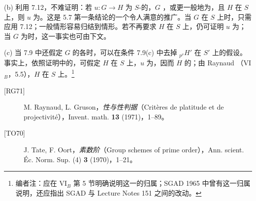 (b) 利用 7.12，不难证明：若 $u:G\to H$ 为 $S$-的，$G$ ，或更一般地为，且 $H$ 在 $S$ 上，则 $u$ 为。这是 5.7 第一条结论的一个令人满意的推广。当 $G$ 在 $S$ 上时，只需应用 7.12；一般情形容易归结到情形。若不再要求 $H$ 在 $S$ 上，仍可证明 $u$ 为；当 $G$ 为时，这一事实也可由下文。

(c) 当 7.9 中还假定 $G$ 的各时，可以在条件 7.9(c) 中去掉 ${}_{p^\nu}H'$ 在 $S'$ 上的假设。事实上，依照证明中的，可假定 $H$ 在 $S$ 上，$u$ 为，因而 $H$ 的；由 Raynaud （VI$_B$，5.5），$H$ 在 $S$ 上。\footnote[41]{编者注：应在 VI$_B$ 第 5 节明确说明这一的归属；SGAD 1965 中曾有这一归属说明，还应指出 SGAD 与 Lecture Notes 151 之间的改动。}

\begin{description}
\item[{[RG71]}] M. Raynaud, L. Gruson，\emph{性与性判据}（Critères de platitude et de projectivité），Invent. math. \textbf{13} (1971)，1--89。
\item[{[TO70]}] J. Tate, F. Oort，\emph{素数阶}（Group schemes of prime order），Ann. scient. Éc. Norm. Sup. (4) \textbf{3} (1970)，1--21。
\end{description}
